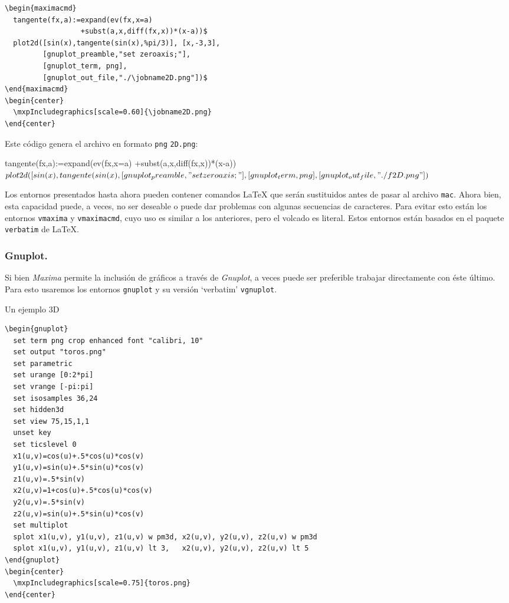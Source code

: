 \documentclass[11pt,a4paper]{article}
\def\Maxima{\emph{Maxima}}
\def\Gnuplot{\emph{Gnuplot}}
\begin{document}
\begin{verbatim}
\begin{maximacmd}
  tangente(fx,a):=expand(ev(fx,x=a)
                  +subst(a,x,diff(fx,x))*(x-a))$
  plot2d([sin(x),tangente(sin(x),%pi/3)], [x,-3,3],
         [gnuplot_preamble,"set zeroaxis;"],
         [gnuplot_term, png],
         [gnuplot_out_file,"./\jobname2D.png"])$
\end{maximacmd}
\begin{center}
  \mxpIncludegraphics[scale=0.60]{\jobname2D.png}
\end{center}
\end{verbatim}   

\pagebreak
Este c\'odigo genera el archivo en formato \verb|png| \texttt{\jobname2D.png}:
\begin{maximacmd}
  tangente(fx,a):=expand(ev(fx,x=a)
                  +subst(a,x,diff(fx,x))*(x-a))$
  plot2d([sin(x),tangente(sin(x),%
         [gnuplot_preamble,"set zeroaxis;"],
         [gnuplot_term, png],
         [gnuplot_out_file,"./\jobname2D.png"])$
\end{maximacmd}
\begin{center}
\end{center}

Los entornos presentados hasta ahora pueden contener comandos \LaTeX{} que ser\'an
sustituidos antes de pasar al archivo \texttt{mac}. Ahora bien, esta capacidad
puede, a veces, no ser deseable o puede dar problemas con algunas secuencias
de caracteres. Para evitar esto est\'an los entornos \texttt{vmaxima} y \texttt{vmaximacmd},
cuyo uso es similar a los anteriores, pero el volcado es literal. Estos entornos
est\'an basados en el paquete \texttt{verbatim} de \LaTeX{}. 

\pagebreak

\subsubsection{Gnuplot.}
Si bien \Maxima{} permite la inclusi\'on de gr\'aficos a trav\'es de \Gnuplot{}, a veces puede ser preferible trabajar directamente con \'este \'ultimo. Para esto usaremos los entornos \texttt{gnuplot} y su versi\'on `verbatim' \texttt{vgnuplot}.

Un ejemplo 3D
\begin{verbatim}
\begin{gnuplot}
  set term png crop enhanced font "calibri, 10"
  set output "toros.png"
  set parametric
  set urange [0:2*pi]
  set vrange [-pi:pi]
  set isosamples 36,24
  set hidden3d
  set view 75,15,1,1
  unset key
  set ticslevel 0
  x1(u,v)=cos(u)+.5*cos(u)*cos(v)
  y1(u,v)=sin(u)+.5*sin(u)*cos(v)
  z1(u,v)=.5*sin(v)
  x2(u,v)=1+cos(u)+.5*cos(u)*cos(v)
  y2(u,v)=.5*sin(v)
  z2(u,v)=sin(u)+.5*sin(u)*cos(v)
  set multiplot
  splot x1(u,v), y1(u,v), z1(u,v) w pm3d, x2(u,v), y2(u,v), z2(u,v) w pm3d
  splot x1(u,v), y1(u,v), z1(u,v) lt 3,   x2(u,v), y2(u,v), z2(u,v) lt 5 
\end{gnuplot}
\begin{center}
  \mxpIncludegraphics[scale=0.75]{toros.png}
\end{center}
\end{verbatim}
\end{document}
